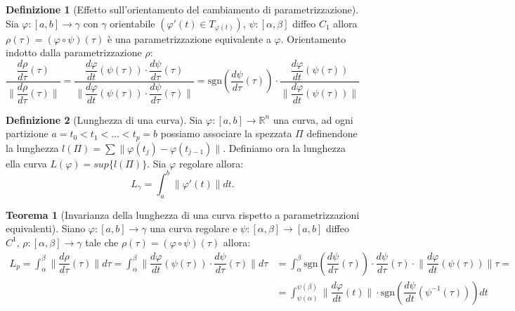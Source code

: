 \documentclass[leqno]{article}
\theoremstyle{definition}
\newtheorem{definition}{Definizione}[section]
\numberwithin{equation}{section}
\newtheorem{theorem}{Teorema}[section]
\theoremstyle{remark}
\begin{document}
	\begin{definition}[Effetto sull'orientamento del cambiamento di parametrizzazione]
		Sia $\varphi : [a,b] \to \gamma$ con $\gamma$ orientabile $(\varphi '(t)\in T_{\varphi(t)})$,  $\psi: [\alpha,\beta]$ diffeo $C_1$ allora $\rho(\tau)=(\varphi \circ \psi)(\tau)$ è una parametrizzazione equivalente a $\varphi$. Orientamento indotto dalla parametrizzazione $\rho:$
		\begin{equation}
			\dfrac{\dfrac{d \rho }{d \tau} (\tau)}{\lVert \dfrac{d \rho}{d \tau}(\tau)\rVert}= \dfrac{ \dfrac{d \varphi }{ dt } (\psi ( \tau ))  \cdot \dfrac{d \psi }{d \tau }( \tau )  }{\lVert  \dfrac{d \varphi }{ dt } (\psi ( \tau ))  \cdot \dfrac{d \psi }{d \tau }( \tau ) \rVert}=\text{sgn} \left( \dfrac{d \psi }{d \tau }( \tau )\right) \cdot \dfrac{ \dfrac{d \varphi }{ dt } (\psi ( \tau ))}{\lVert \dfrac{d \varphi }{ dt } (\psi ( \tau ))\rVert}
		\end{equation}
	\end{definition}
	
	\begin{definition}[Lunghezza di una curva]
		Sia $\varphi : [a,b] \to \mathbb{R}^n$ una curva, ad ogni partizione $a = t_0 < t_1 < \dots < t_p = b$ possiamo associare la spezzata $\Pi$ definendone la lunghezza $l(\Pi)=\sum \lVert \varphi(t_j)-\varphi(t_{j-1}) \rVert$. Definiamo ora la lunghezza ella curva $L(\varphi)=sup\{l(\Pi)\}$.
		Sia $\varphi$ regolare allora:
		\begin{equation}
			L_{\gamma}=\int_a^b\lVert \varphi '(t)\rVert dt.
		\end{equation}    
	\end{definition}
	
	\begin{theorem}[Invarianza della lunghezza di una curva rispetto a parametrizzazioni equivalenti]
		Siano $\varphi : [a,b] \to \gamma$ una curva regolare e $\psi : [\alpha, \beta] \to [a,b]$ diffeo $C^1$,  $\rho : [\alpha,\beta]\to \gamma$ tale che $\rho(\tau)=(\varphi \circ \psi)(\tau)$ allora:   
		\begin{equation}
			\begin{aligned}
				L_p=\int_{\alpha}^{\beta} \lVert \dfrac{d \rho}{d \tau}(\tau)\rVert d\tau= \int_{\alpha}^{\beta} \lVert  \dfrac{d \varphi }{ dt } (\psi ( \tau ))  \cdot \dfrac{d \psi }{d \tau }( \tau ) \rVert d\tau &= \int_{\alpha}^{\beta} \text{sgn}\left( \dfrac{d\psi}{d\tau}(\tau)\right) \cdot \dfrac{d\psi}{d\tau}(\tau) \cdot \lVert \dfrac{d \varphi }{ dt } (\psi ( \tau ))\rVert\tau= \\
				&=\int_{\psi(\alpha)}^{\psi(\beta)}\lVert \dfrac{d \varphi}{dt}(t)\rVert\cdot \text{sgn}\left(\dfrac{d\psi}{dt}(\psi^{-1}(\tau))\right)dt 
			\end{aligned}
		\end{equation}
	\end{theorem}
	
\end{document}
